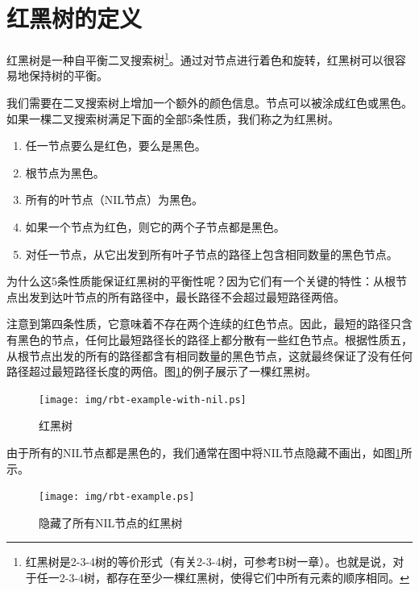 \documentclass{ctexart}
\begin{document}
\section{红黑树的定义}

红黑树是一种自平衡二叉搜索树\cite{wiki-rbt}\footnote{红黑树是2-3-4树的等价形式（有关2-3-4树，可参考B树一章）。也就是说，对于任一2-3-4树，都存在至少一棵红黑树，使得它们中所有元素的顺序相同。}。通过对节点进行着色和旋转，红黑树可以很容易地保持树的平衡。

我们需要在二叉搜索树上增加一个额外的颜色信息。节点可以被涂成红色或黑色。如果一棵二叉搜索树满足下面的全部5条性质，我们称之为红黑树\cite{CLRS}。

\begin{enumerate}
\item 任一节点要么是红色，要么是黑色。
\item 根节点为黑色。
\item 所有的叶节点（NIL节点）为黑色。
\item 如果一个节点为红色，则它的两个子节点都是黑色。
\item 对任一节点，从它出发到所有叶子节点的路径上包含相同数量的黑色节点。
\end{enumerate}

为什么这5条性质能保证红黑树的平衡性呢？因为它们有一个关键的特性：从根节点出发到达叶节点的所有路径中，最长路径不会超过最短路径两倍。

注意到第四条性质，它意味着不存在两个连续的红色节点。因此，最短的路径只含有黑色的节点，任何比最短路径长的路径上都分散有一些红色节点。根据性质五，从根节点出发的所有的路径都含有相同数量的黑色节点，这就最终保证了没有任何路径超过最短路径长度的两倍\cite{wiki-rbt}。图\ref{fig:rbt-example-with-nil}的例子展示了一棵红黑树。

\begin{figure}[htbp]
       \begin{center}
	\texttt{[image: img/rbt-example-with-nil.ps]}
        \caption{红黑树} \label{fig:rbt-example-with-nil}
       \end{center}
\end{figure}

由于所有的NIL节点都是黑色的，我们通常在图中将NIL节点隐藏不画出，如图\ref{fig:rbt-example-with-nil}所示。

\begin{figure}[htbp]
  \centering
  \texttt{[image: img/rbt-example.ps]}
  \caption{隐藏了所有NIL节点的红黑树} \label{fig:rbt-example}
\end{figure}
\end{document}
